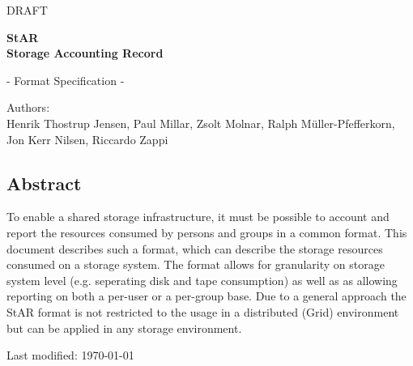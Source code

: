 
\huge{DRAFT}

\vspace{1cm}

\begin{center}
{\Large \bf StAR 
\\Storage Accounting Record}
\end{center}

\begin{center}
{\Large - Format Specification -}
\end{center}

\vspace{1.5cm}

\large{Authors:\\
Henrik Thostrup Jensen, Paul Millar, Zsolt Molnar, Ralph M\"uller-Pfefferkorn, Jon Kerr Nilsen, Riccardo Zappi
}

\vspace{0.5cm}

\subsection*{Abstract}

To enable a shared storage infrastructure, it must be possible to account and
report the resources consumed by persons and groups in a common format. This
document describes such a format, which can describe the storage resources
consumed on a storage system. The format allows for granularity on storage
system level (e.g. seperating disk and tape consumption) as well as as
allowing reporting on both a per-user or a per-group base.
Due to a general approach the StAR format is not restricted to the usage in
a distributed (Grid) environment but can be applied in any storage environment.

\vspace{.5cm}

\noindent

\vspace{2cm}

Last modified: \today


